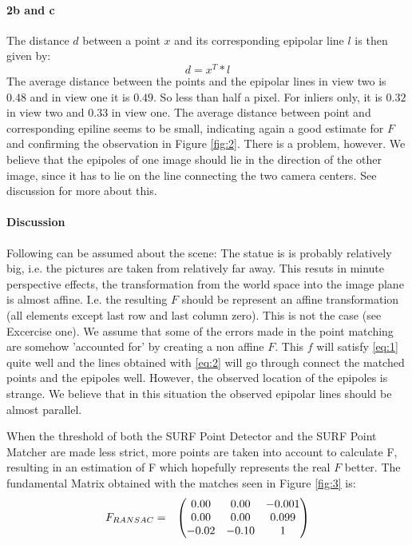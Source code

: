 \documentclass[11pt,a4paper]{article}
\begin{document}
\paragraph{2b and c}
The distance $d$ between a point $x$ and its corresponding epipolar line $l$ is then given by:
\begin{equation}
d=x^{T}*l
\end{equation}
The average distance between the points and the epipolar lines in view two is $0.48$ and in view one it is $0.49$. So less than half a pixel. For inliers only, it is $0.32$ in view two and $0.33$ in view one. The average distance between point and corresponding epiline seems to be small, indicating again a good estimate for $F$ and confirming the observation in Figure \ref{fig:2}. There is a problem, however. We believe that the epipoles of one image should lie in the direction of the other image, since it has to lie on the line connecting the two camera centers. See discussion for more about this.
\paragraph{Discussion}
Following can be assumed about the scene: The statue is is probably relatively big, i.e. the pictures are taken from relatively far away. This resuts in minute perspective effects, the transformation from the world space into the image plane is almost affine. I.e. the resulting $F$ should be represent an affine transformation (all elements except last row and last column zero). This is not the case (see Excercise one). We assume that some of the errors made in the point matching are somehow 'accounted for' by creating a non affine $F$. This $f$ will satisfy \ref{eq:1} quite well and the lines obtained with \ref{eq:2} will go through connect the matched points and the epipoles well. However, the observed location of the epipoles is strange. We believe that in this situation the observed epipolar lines should be almost parallel.

When the threshold of both the SURF Point Detector and the SURF Point Matcher are made less strict, more points are taken into account to calculate F, resulting in an estimation of F which hopefully represents the real $F$ better. The fundamental Matrix obtained with the matches seen in Figure \ref{fig:3} is:
\[
\begin{array}{lc}
F_{RANSAC} = & \left(\begin{array}{@{}ccc@{}}
                    0.00 & 0.00 & -0.001 \\
                    0.00 & 0.00 & 0.099 \\
                    -0.02 & -0.10 & 1
                  \end{array}\right)\\ [15pt]
  
\end{array} 
\]
\end{document}
